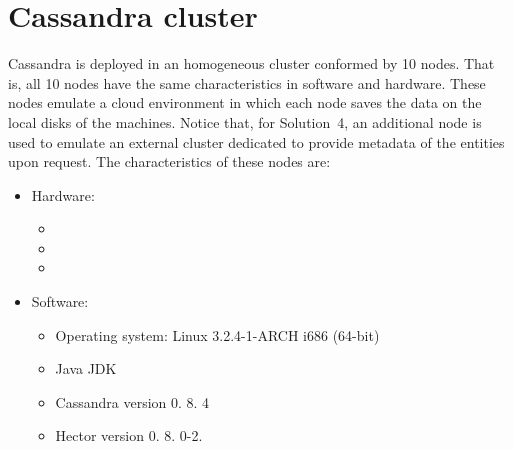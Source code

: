 % 	
% 			
% 			


\section{Cassandra cluster} \label{sexp:CassandraCluster}
Cassandra is deployed in an homogeneous cluster conformed by 10 nodes. That is,
 all 10 nodes have the same characteristics in software and hardware. These
 nodes emulate a cloud environment in which each node saves
 the data on the local disks of the machines. Notice that, for Solution~4,  an
 additional node is used to emulate an external cluster dedicated to provide
 metadata of the entities upon request.
 The characteristics of these nodes are:


\begin{itemize}
  \item Hardware: 
  	\begin{itemize}
  	  \item %
  	  \item %
  	  \item %
  	 \end{itemize}
  \item Software: 
  \begin{itemize}
    \item Operating system: Linux 3.2.4-1-ARCH i686 (64-bit)
    \item Java JDK
    \item Cassandra version 0. 8. 4 
    \item Hector version 0. 8. 0-2.
  \end{itemize}
\end{itemize}


